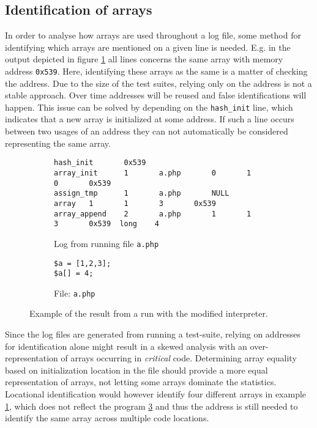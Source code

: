 \subsection{Identification of arrays}
In order to analyse how arrays are used throughout a log file, some method for identifying which arrays are mentioned on a given line is needed. E.g. in the output depicted in figure \ref{lst:id_array_code_out} all lines concerns the same array with memory address \texttt{0x539}. Here, identifying these arrays as the same is a matter of checking the address. Due to the size of the test suites, relying only on the address is not a stable approach. Over time addresses will be reused and false identifications will happen. This issue can be solved by depending on the \texttt{hash\_init} line, which indicates that a new array is initialized at some address. If such a line occurs between two usages of an address they can not automatically be considered representing the same array. 
\begin{figure}
\centering
\begin{subfigure}{\textwidth}
\begin{lstlisting}[mathescape, deletekeywords={array},basicstyle=\tiny]
hash_init       0x539
array_init      1       a.php       0       1       0       0x539
assign_tmp      1       a.php       NULL    array   1       1       3       0x539
array_append    2       a.php       1       1       3       0x539  long    4
\end{lstlisting}
\caption{Log from running file \texttt{a.php}}
\label{lst:id_array_code_out}
\end{subfigure}
\begin{subfigure}{\textwidth}
\begin{lstlisting}
$a = [1,2,3];
$a[] = 4;
\end{lstlisting}
\caption{File: \texttt{a.php}}
\label{lst:id_array_code}
\end{subfigure}
\caption{Example of the result from a run with the modified interpreter.}
\end{figure}

Since the log files are generated from running a test-suite, relying on addresses for identification alone might result in a skewed analysis with an over-representation of arrays occurring in \emph{critical} code. Determining array equality based on initialization location in the file should provide a more equal representation of arrays, not letting some arrays dominate the statistics. Locational identification would however identify four different arrays in example \ref{lst:id_array_code_out}, which does not reflect the program \ref{lst:id_array_code} and thus the address is still needed to identify the same array across multiple code locations.


